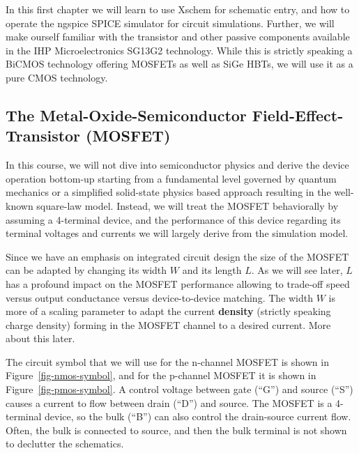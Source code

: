 \documentclass[
  a4paper,
  DIV=11,
  numbers=noendperiod]{scrartcl}
\begin{document}
In this first chapter we will learn to use Xschem for schematic entry,
and how to operate the ngspice SPICE simulator for circuit simulations.
Further, we will make ourself familiar with the transistor and other
passive components available in the IHP Microelectronics SG13G2
technology. While this is strictly speaking a BiCMOS technology offering
MOSFETs as well as SiGe HBTs, we will use it as a pure CMOS technology.

\subsection{The Metal-Oxide-Semiconductor Field-Effect-Transistor
(MOSFET)}\label{sec-mosfet}

In this course, we will not dive into semiconductor physics and derive
the device operation bottom-up starting from a fundamental level
governed by quantum mechanics or a simplified solid-state physics based
approach resulting in the well-known square-law model. Instead, we will
treat the MOSFET behaviorally by assuming a 4-terminal device, and the
performance of this device regarding its terminal voltages and currents
we will largely derive from the simulation model.

Since we have an emphasis on integrated circuit design the size of the
MOSFET can be adapted by changing its width \(W\) and its length \(L\).
As we will see later, \(L\) has a profound impact on the MOSFET
performance allowing to trade-off speed versus output conductance versus
device-to-device matching. The width \(W\) is more of a scaling
parameter to adapt the current \textbf{density} (strictly speaking
charge density) forming in the MOSFET channel to a desired current. More
about this later.

The circuit symbol that we will use for the n-channel MOSFET is shown in
Figure~\ref{fig-nmos-symbol}, and for the p-channel MOSFET it is shown
in Figure~\ref{fig-pmos-symbol}. A control voltage between gate (``G'')
and source (``S'') causes a current to flow between drain (``D'') and
source. The MOSFET is a 4-terminal device, so the bulk (``B'') can also
control the drain-source current flow. Often, the bulk is connected to
source, and then the bulk terminal is not shown to declutter the
schematics.
\end{document}
